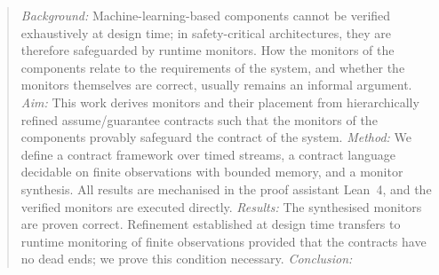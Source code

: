 \begin{abstract}
\emph{Background:} Machine-learning-based components cannot be verified exhaustively at design time; in safety-critical architectures, they are therefore safeguarded by runtime monitors. How the monitors of the components relate to the requirements of the system, and whether the monitors themselves are correct, usually remains an informal argument. \emph{Aim:} This work derives monitors and their placement from hierarchically refined assume/guarantee contracts such that the monitors of the components provably safeguard the contract of the system. \emph{Method:} We define a contract framework over timed streams, a contract language decidable on finite observations with bounded memory, and a monitor synthesis. All results are mechanised in the proof assistant Lean~4, and the verified monitors are executed directly. \emph{Results:} The synthesised monitors are proven correct. Refinement established at design time transfers to runtime monitoring of finite observations provided that the contracts have no dead ends; we prove this condition necessary.  \emph{Conclusion:} 

\end{abstract}
